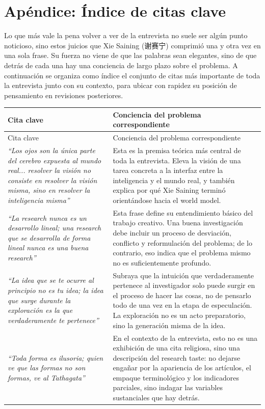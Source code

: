 \section*{Apéndice: Índice de citas clave}

Lo que más vale la pena volver a ver de la entrevista no suele ser algún punto noticioso, sino estos juicios que Xie Saining (谢赛宁) comprimió una y otra vez en una sola frase. Su fuerza no viene de que las palabras sean elegantes, sino de que detrás de cada una hay una conciencia de largo plazo sobre el problema. A continuación se organiza como índice el conjunto de citas más importante de toda la entrevista junto con su contexto, para ubicar con rapidez su posición de pensamiento en revisiones posteriores.

\begin{longtable}{>{\raggedright\arraybackslash}p{} >{\raggedright\arraybackslash}p{}}
\toprule
Cita clave & Conciencia del problema correspondiente \\
\midrule
\endfirsthead
\toprule
Cita clave & Conciencia del problema correspondiente \\
\midrule
\endhead
\textit{``Los ojos son la única parte del cerebro expuesta al mundo real... resolver la visión no consiste en resolver la visión misma, sino en resolver la inteligencia misma''} & Esta es la premisa teórica más central de toda la entrevista. Eleva la visión de una tarea concreta a la interfaz entre la inteligencia y el mundo real, y también explica por qué Xie Saining terminó orientándose hacia el world model. \\
\textit{``La research nunca es un desarrollo lineal; una research que se desarrolla de forma lineal nunca es una buena research''} & Esta frase define su entendimiento básico del trabajo creativo. Una buena investigación debe incluir un proceso de desviación, conflicto y reformulación del problema; de lo contrario, eso indica que el problema mismo no es suficientemente profundo. \\
\textit{``La idea que se te ocurre al principio no es tu idea; la idea que surge durante la exploración es la que verdaderamente te pertenece''} & Subraya que la intuición que verdaderamente pertenece al investigador solo puede surgir en el proceso de hacer las cosas, no de pensarlo todo de una vez en la etapa de especulación. La exploración no es un acto preparatorio, sino la generación misma de la idea. \\
\textit{``Toda forma es ilusoria; quien ve que las formas no son formas, ve al Tathagata''} & En el contexto de la entrevista, esto no es una exhibición de una cita religiosa, sino una descripción del research taste: no dejarse engañar por la apariencia de los artículos, el empaque terminológico y los indicadores parciales, sino indagar las variables sustanciales que hay detrás. \\

\end{longtable}
